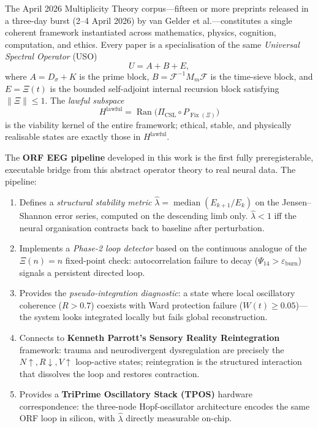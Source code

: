 \documentclass[12pt,a4paper]{article}
\theoremstyle{plain}
\theoremstyle{definition}
\newcommand{\Hlawful}{H^{\mathrm{lawful}}}
\newcommand{\PiCSL}{\Pi_{\mathrm{CSL}}}
\newcommand{\hatlambda}{\hat{\lambda}}
\renewcommand{\Psi}{\varPsi}
\begin{document}
The April 2026 Multiplicity Theory corpus---fifteen or more preprints released in a
three-day burst (2--4 April 2026) by van Gelder et al.---constitutes a single coherent
framework instantiated across mathematics, physics, cognition, computation, and ethics.
Every paper is a specialisation of the same \emph{Universal Spectral Operator} (USO)
\begin{equation}
  U = A + B + E,
  \label{eq:uso}
\end{equation}
where $A = D_\sigma + K$ is the prime block, $B = \mathcal{F}^{-1}M_m\mathcal{F}$ is
the time-sieve block, and $E = \Xi(t)$ is the bounded self-adjoint internal recursion
block satisfying $\|\Xi\| \leq 1$.  The \emph{lawful subspace}
\begin{equation}
  \Hlawful = \operatorname{Ran}\!\bigl(\PiCSL \circ P_{\operatorname{Fix}(\Xi)}\bigr)
  \label{eq:hlawful}
\end{equation}
is the viability kernel of the entire framework; ethical, stable, and physically
realisable states are exactly those in $\Hlawful$.

\medskip
The \textbf{ORF EEG pipeline} developed in this work is the first fully preregisterable,
executable bridge from this abstract operator theory to real neural data.  The pipeline:

\begin{enumerate}[label=\textbf{\arabic*.}, leftmargin=2em]
  \item Defines a \emph{structural stability metric} $\hatlambda = \operatorname{median}(E_{k+1}/E_k)$
        on the Jensen--Shannon error series, computed on the descending limb only.
        $\hatlambda < 1$ iff the neural organisation contracts back to baseline after
        perturbation.
  \item Implements a \emph{Phase-2 loop detector} based on the continuous analogue of
        the $\Xi(n)=n$ fixed-point check: autocorrelation failure to decay
        ($\Psi_{14} > \varepsilon_{\mathrm{burn}}$) signals a persistent directed loop.
  \item Provides the \emph{pseudo-integration diagnostic}: a state where local
        oscillatory coherence ($R > 0.7$) coexists with Ward protection failure
        ($W(t) \geq 0.05$)---the system looks integrated locally but fails global
        reconstruction.
  \item Connects to \textbf{Kenneth Parrott's Sensory Reality Reintegration} framework:
        trauma and neurodivergent dysregulation are precisely the
        $N\uparrow, R\downarrow, V\uparrow$ loop-active states; reintegration is the
        structured interaction that dissolves the loop and restores contraction.
  \item Provides a \textbf{TriPrime Oscillatory Stack (TPOS)} hardware correspondence:
        the three-node Hopf-oscillator architecture encodes the same ORF loop in
        silicon, with $\hatlambda$ directly measurable on-chip.
\end{enumerate}
\end{document}
